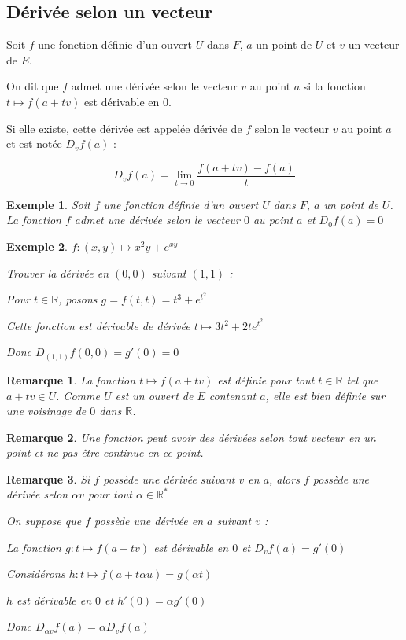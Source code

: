 \documentclass[a4paper,12pt]{book}
\newcommand{\Def}[2]{\begin{tcolorbox}[sharp corners, colback=white,colframe=blue!90!black!75, title=Définition : #1]#2\end{tcolorbox}}
\newtheorem{Exe}{Exemple}[section]
\newtheorem{Rem}{Remarque}[section]
\def\R{\mathbb{R}}
\begin{document}
\subsection{Dérivée selon un vecteur}
\Def{}{Soit $f$ une fonction définie d'un ouvert $U$ dans $F$, $a$ un point de $U$ et $v$ un vecteur de $E$.
\par On dit que $f$ admet une dérivée selon le vecteur $v$ au point $a$ si la fonction $t\mapsto f(a+tv)$ est dérivable en $0$.
\par Si elle existe, cette dérivée est appelée dérivée de $f$ selon le vecteur $v$ au point $a$ et est notée $D_vf(a)$ :
\par $$D_vf(a) = \lim\limits_{t\to 0}\frac{f(a+tv)-f(a)}{t}$$}
\begin{Exe}
Soit $f$ une fonction définie d'un ouvert $U$ dans $F$, $a$ un point de $U$. La fonction $f$ admet une dérivée selon le vecteur $0$ au point $a$ et $D_0f(a) = 0$
\end{Exe}
\begin{Exe}
$f:(x,y)\mapsto x^2y + e^{xy}$
\par Trouver la dérivée en $(0,0)$ suivant $(1, 1)$ :
\par Pour $t\in\R$, posons $g =f(t,t) = t^3 + e^{t^2}$
\par Cette fonction est dérivable de dérivée $t\mapsto 3t^2 + 2te^{t^2}$
\par Donc $D_{(1,1)}f(0,0) = g'(0) = 0$
\end{Exe}
\begin{Rem}
La fonction $t\mapsto f(a+tv)$ est définie pour tout $t\in\R$ tel que $a+tv\in U$. Comme $U$ est un ouvert de $E$ contenant $a$, elle est bien définie sur une voisinage de $0$ dans $\R$.
\end{Rem}
\begin{Rem}
Une fonction peut avoir des dérivées selon tout vecteur en un point et ne pas être continue en ce point.
\end{Rem}
\begin{Rem}
Si $f$ possède une dérivée suivant $v$ en $a$, alors $f$ possède une dérivée selon  $\alpha v$ pour tout $\alpha\in \R^*$
\par On suppose que $f$ possède une dérivée en $a$ suivant $v$ :
\par La fonction $g:t\mapsto f(a+tv)$ est dérivable en $0$ et $D_vf(a) = g'(0)$
\par Considérons $h:t\mapsto f(a+t\alpha u) = g(\alpha t)$
\par $h$ est dérivable en $0$ et $h'(0) = \alpha g'(0)$
\par Donc $D_{\alpha v}f(a) = \alpha D_vf(a)$
\end{Rem}
\end{document}
